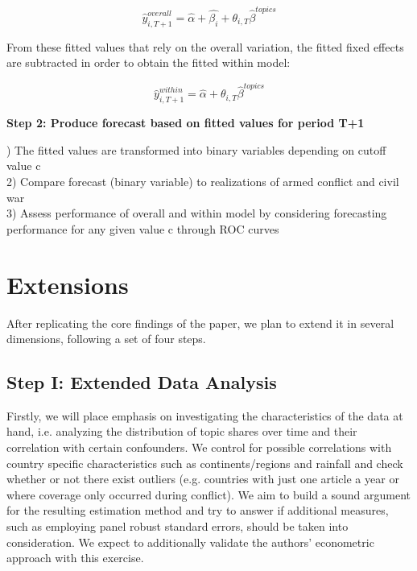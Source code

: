 \begin{equation}
    \hat{y}_{i,T+1}^{overall} = \hat{\alpha} + \hat{\beta_i} + \theta_{i,T}\hat{\beta}^{topics}
\end{equation}

\noindent From these fitted values that rely on the overall variation, the fitted fixed effects are subtracted in order to obtain the fitted within model:

\begin{equation}
    \hat{y}_{i,T+1}^{within} = \hat{\alpha} + \theta_{i,T}\hat{\beta}^{topics}
\end{equation}

\noindent \textbf{Step 2: Produce forecast based on fitted values for period T+1}

) The fitted values are transformed into binary variables depending on cutoff value c\\
2) Compare forecast (binary variable) to realizations of armed conflict and civil war\\
3) Assess performance of overall and within model by considering forecasting performance for any given value c through ROC curves 


\section{Extensions}
After replicating the core findings of the paper, we plan to extend it in several dimensions, following a set of four steps. 

\subsection{Step I: Extended Data Analysis}
Firstly, we will place emphasis on investigating the characteristics of the data at hand, i.e. analyzing the distribution of topic shares over time and their correlation with certain confounders. We control for possible correlations with country specific characteristics such as continents/regions and rainfall and check whether or not there exist outliers (e.g. countries with just one article a year or where coverage only occurred during conflict). We aim to build a sound argument for the resulting estimation method and try to answer if additional measures, such as employing panel robust standard errors, %
should be taken into consideration. We expect to additionally validate the authors' econometric approach with this exercise. 

